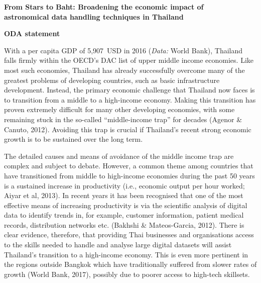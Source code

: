 \documentclass[11pt]{article}
\begin{document}
\setcounter{figure}{0}
\noindent
{\LARGE \bf From Stars to Baht: Broadening the economic impact of \\
astronomical data handling techniques in Thailand}

\vspace{3mm}
\noindent
{\Large \bf ODA statement}

\vspace{2mm}
\noindent
With a per capita GDP of 5,907~USD in 2016 ({\it Data:} World Bank), Thailand falls firmly within the OECD's DAC list of upper middle income economies. Like most such economies, Thailand has already successfully overcome many of the greatest problems of developing countries, such as basic infrastructure development. Instead, the primary economic challenge that Thailand now faces is to transition from a middle to a high-income economy. Making this transition has proven extremely difficult for many other developing economies, with some remaining stuck in the so-called ``middle-income trap'' for decades (Agenor \& Canuto, 2012). Avoiding this trap is crucial if Thailand's recent strong economic growth is to be sustained over the long term.     

\vspace{2mm}
\noindent
The detailed causes and means of avoidance of the middle income trap are complex and subject to debate. However, a common theme among countries that have transitioned from middle to high-income economies during the past 50 years is a sustained increase in productivity (i.e., economic output per hour worked; Aiyar et al, 2013). In recent years it has been recognised that one of the most effective means of increasing productivity is via the scientific analysis of digital data to identify trends in, for example, customer information, patient medical records, distribution networks etc. (Bakhshi \& Mateos-Garcia, 2012). There is clear evidence, therefore, that providing Thai businesses and organisations access to the skills needed to handle and analyse large digital datasets will assist Thailand's transition to a high-income economy. This is even more pertinent in the regions outside Bangkok which have traditionally suffered from slower rates of growth (World Bank, 2017), possibly due to poorer access to high-tech skillsets.    
\end{document}
